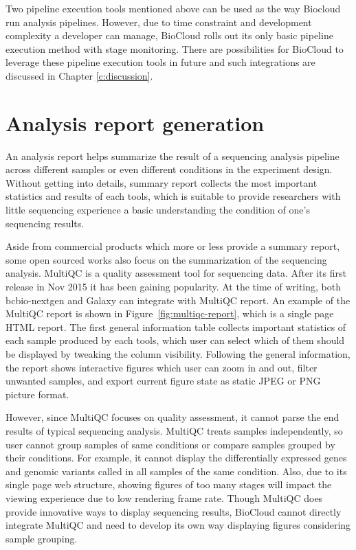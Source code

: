 Two pipeline execution tools mentioned above can be used as the way Biocloud
run analysis pipelines. However, due to time constraint and development
complexity a developer can manage, BioCloud rolls out its only basic pipeline
execution method with stage monitoring. There are possibilities for BioCloud to
leverage these pipeline execution tools in future and such integrations are
discussed in Chapter \ref{c:discussion}.


\section{Analysis report generation}
\label{analysis-report-generation}

An analysis report helps summarize the result of a sequencing analysis pipeline
across different samples or even different conditions in the experiment design.
Without getting into details, summary report collects the most important
statistics and results of each tools, which is suitable to provide researchers
with little sequencing experience a basic understanding the condition of one's
sequencing results.

Aside from commercial products which more or less provide a summary report,
some open sourced works also focus on the summarization of the sequencing
analysis. MultiQC \cite{ewels2016:multiqc} is a quality assessment tool for
sequencing data. After its first release in Nov 2015 it has been gaining
popularity. At the time of writing, both bcbio-nextgen and Galaxy can integrate
with MultiQC report. An example of the MultiQC report is shown in
Figure~\ref{fig:multiqc-report}, which is a single page HTML report. The first
general information table collects important statistics of each sample produced
by each tools, which user can select which of them should be displayed by
tweaking the column visibility. Following the general information, the report
shows interactive figures which user can zoom in and out, filter unwanted
samples, and export current figure state as static JPEG or PNG picture format.

However, since MultiQC focuses on quality assessment, it cannot parse the end
results of typical sequencing analysis. MultiQC treats samples independently,
so user cannot group samples of same conditions or compare samples grouped by
their conditions. For example, it cannot display the differentially expressed
genes and genomic variants called in all samples of the same condition. Also,
due to its single page web structure, showing figures of too many stages will
impact the viewing experience due to low rendering frame rate. Though MultiQC
does provide innovative ways to display sequencing results, BioCloud cannot
directly integrate MultiQC and need to develop its own way displaying figures
considering sample grouping.



